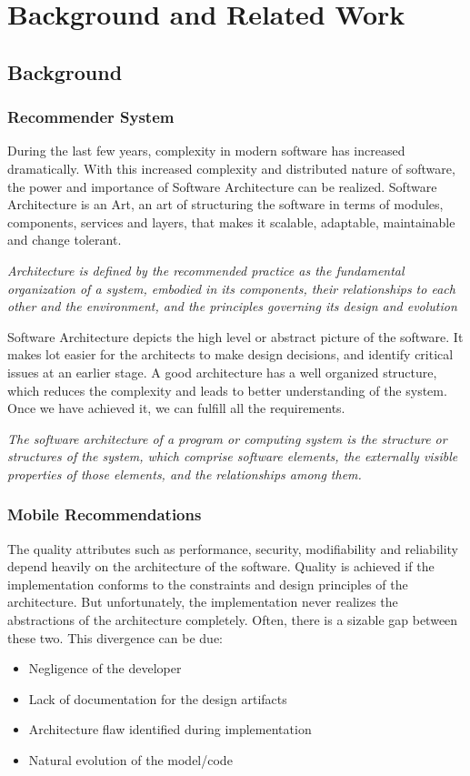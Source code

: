 
\chapter{Background and Related Work}
\section{Background}
\subsection{Recommender System}
During the last few years, complexity in modern software has increased dramatically. With this increased complexity and distributed nature of software, the power and importance of Software Architecture can be realized. Software Architecture is an Art, an art of structuring the software in terms of modules, components, services and layers, that makes it scalable, adaptable, maintainable and change tolerant.\newline

\textit{Architecture is defined by the recommended practice as the fundamental organization of a system, embodied in its components, their relationships to each other and the environment, and the principles governing its design and evolution} \cite{architecture_def1} \newline 

Software Architecture depicts the high level or abstract picture of the software. It makes lot easier for the architects to make design decisions, and identify critical issues at an earlier stage. A good  architecture has a well organized structure, which reduces the complexity and leads to better understanding of the system. Once we have achieved it, we can fulfill all the requirements.\newline

\textit{The software architecture of a program or computing system is the structure or structures of the system, which comprise software elements, the externally visible properties of those elements, and the relationships among them.} \cite{architecture_def2}

\subsection{Mobile Recommendations}
The quality attributes such as performance, security, modifiability and reliability depend heavily on the architecture of the software. Quality is achieved if the implementation conforms to the constraints and design principles of the architecture. But unfortunately, the implementation never realizes the abstractions of the architecture completely. Often, there is a sizable gap between these two. This divergence can be due: 
\begin{itemize}
\item Negligence of the developer 
\item Lack of documentation for the design artifacts
\item Architecture flaw identified during implementation 
\item Natural evolution of the model/code  
\end{itemize}

